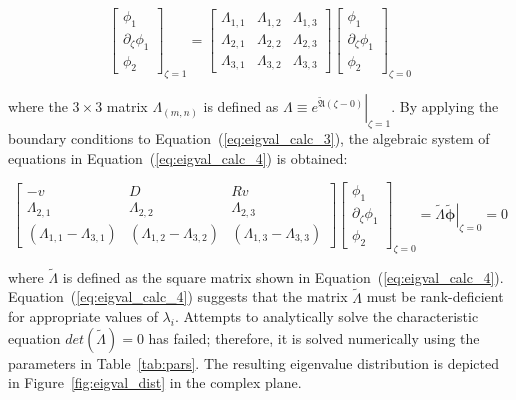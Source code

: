 \begin{equation} \label{eq:eigval_calc_3}
    \begin{bmatrix}
        \phi_1 \\ \partial_\zeta \phi_1 \\ \phi_2
    \end{bmatrix}_{\zeta=1} = \begin{bmatrix}
        \Lambda_{1,1} & \Lambda_{1,2} & \Lambda_{1,3} \\
        \Lambda_{2,1} & \Lambda_{2,2} & \Lambda_{2,3} \\
        \Lambda_{3,1} & \Lambda_{3,2} & \Lambda_{3,3}
    \end{bmatrix} \begin{bmatrix}
        \phi_1 \\ \partial_\zeta \phi_1 \\ \phi_2
    \end{bmatrix}_{\zeta=0}
\end{equation}

where the $ 3 \times 3$ matrix $\Lambda_{(m,n)}$ is defined as $\Lambda \equiv \left. e^{\tilde{\mathfrak{A}} (\zeta - 0)} \right|_{\zeta = 1}$. By applying the boundary conditions to Equation~(\ref{eq:eigval_calc_3}), the algebraic system of equations in Equation~(\ref{eq:eigval_calc_4}) is obtained:

\begin{equation} \label{eq:eigval_calc_4}
    \begin{bmatrix}
        -v & D & Rv \\
        \Lambda_{2,1} & \Lambda_{2,2} & \Lambda_{2,3} \\
        (\Lambda_{1,1} - \Lambda_{3,1}) & (\Lambda_{1,2} - \Lambda_{3,2}) & (\Lambda_{1,3} - \Lambda_{3,3})
    \end{bmatrix} \begin{bmatrix}
        \phi_1 \\ \partial_\zeta \phi_1 \\ \phi_2
    \end{bmatrix}_{\zeta=0} = \tilde{\Lambda} \left. \tilde{\bm{\phi}} \right|_{\zeta = 0} = 0
\end{equation}

where $\tilde{\Lambda}$ is defined as the square matrix shown in Equation~(\ref{eq:eigval_calc_4}). Equation~(\ref{eq:eigval_calc_4}) suggests that the matrix $\tilde{\Lambda}$ must be rank-deficient for appropriate values of $\lambda_i$. Attempts to analytically solve the characteristic equation $det(\tilde{\Lambda}) = 0$ has failed; therefore, it is solved numerically using the parameters in Table~\ref{tab:pars}. The resulting eigenvalue distribution is depicted in Figure~\ref{fig:eigval_dist} in the complex plane.

